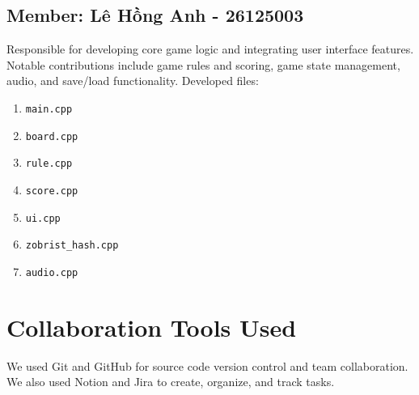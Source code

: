 \documentclass[11pt]{article}
\begin{document}
\subsection{Member: Lê Hồng Anh - 26125003}

Responsible for developing core game logic and integrating user interface features. Notable contributions include game rules and scoring, game state management, audio, and save/load functionality.
Developed files:
\begin{enumerate}
    \item \texttt{main.cpp}
    \item \texttt{board.cpp}
    \item \texttt{rule.cpp}
    \item \texttt{score.cpp}
    \item \texttt{ui.cpp}
    \item \texttt{zobrist\_hash.cpp}
    \item \texttt{audio.cpp}
\end{enumerate}

\section{Collaboration Tools Used}
We used Git and GitHub for source code version control and team collaboration. We also used Notion and Jira to create, organize, and track tasks.
\end{document}
